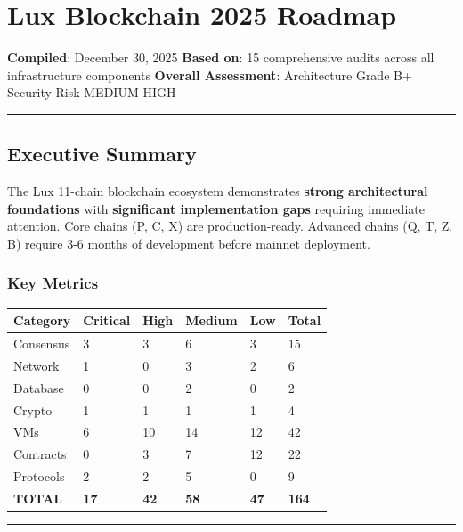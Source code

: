 \documentclass[
]{article}
\author{}
\date{}
\newcounter{none} %
\begin{document}
\section{Lux Blockchain 2025 Roadmap}\label{lux-blockchain-2025-roadmap}

\textbf{Compiled}: December 30, 2025 \textbf{Based on}: 15 comprehensive
audits across all infrastructure components \textbf{Overall Assessment}:
Architecture Grade B+ \textbar{} Security Risk MEDIUM-HIGH

\begin{center}\rule{0.5\linewidth}{0.5pt}\end{center}

\subsection{Executive Summary}\label{executive-summary}

The Lux 11-chain blockchain ecosystem demonstrates \textbf{strong
architectural foundations} with \textbf{significant implementation gaps}
requiring immediate attention. Core chains (P, C, X) are
production-ready. Advanced chains (Q, T, Z, B) require 3-6 months of
development before mainnet deployment.

\subsubsection{Key Metrics}\label{key-metrics}

{\def\LTcaptype{none} %
\begin{longtable}[]{@{}llllll@{}}
\toprule\noalign{}
Category & Critical & High & Medium & Low & Total \\
\midrule\noalign{}
\endhead
\bottomrule\noalign{}
\endlastfoot
Consensus & 3 & 3 & 6 & 3 & 15 \\
Network & 1 & 0 & 3 & 2 & 6 \\
Database & 0 & 0 & 2 & 0 & 2 \\
Crypto & 1 & 1 & 1 & 1 & 4 \\
VMs & 6 & 10 & 14 & 12 & 42 \\
Contracts & 0 & 3 & 7 & 12 & 22 \\
Protocols & 2 & 2 & 5 & 0 & 9 \\
\textbf{TOTAL} & \textbf{17} & \textbf{42} & \textbf{58} & \textbf{47} &
\textbf{164} \\
\end{longtable}
}

\begin{center}\rule{0.5\linewidth}{0.5pt}\end{center}
\end{document}
